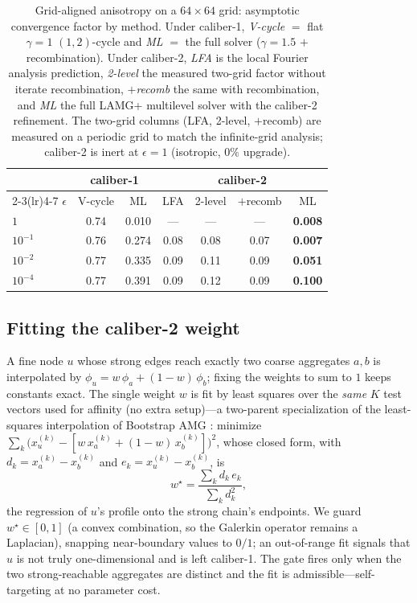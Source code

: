 \documentclass[leqno,letterpaper]{etna}
\begin{document}
\begin{table}[h]\centering\footnotesize\setlength{\tabcolsep}{4pt}
\caption{Grid-aligned anisotropy on a $64\times64$ grid: asymptotic convergence factor by method.
Under caliber-1, \emph{V-cycle} $=$ flat $\gamma{=}1$ $(1,2)$-cycle and \emph{ML} $=$ the full solver
($\gamma{=}1.5$ $+$ recombination). Under caliber-2, \emph{LFA} is the local Fourier analysis
prediction, \emph{2-level} the measured two-grid factor without iterate recombination, \emph{$+$recomb}
the same with recombination, and \emph{ML} the full LAMG+ multilevel solver with the caliber-2
refinement. The two-grid columns (LFA, 2-level, $+$recomb) are measured on a periodic grid to match the
infinite-grid analysis; caliber-2 is inert at $\epsilon{=}1$ (isotropic, $0\%$ upgrade).}\label{tab:aniso}
\begin{tabular}{l cc cccc}
\toprule
 & \multicolumn{2}{c}{caliber-1} & \multicolumn{4}{c}{caliber-2}\\
\cmidrule(lr){2-3}\cmidrule(lr){4-7}
$\epsilon$ & V-cycle & ML & LFA & 2-level & $+$recomb & ML\\
\midrule
$1$       & 0.74 & 0.010 & ---  & ---  & ---  & \textbf{0.008}\\
$10^{-1}$ & 0.76 & 0.274 & 0.08 & 0.08 & 0.07 & \textbf{0.007}\\
$10^{-2}$ & 0.77 & 0.335 & 0.09 & 0.11 & 0.09 & \textbf{0.051}\\
$10^{-4}$ & 0.77 & 0.391 & 0.09 & 0.12 & 0.09 & \textbf{0.100}\\
\bottomrule
\end{tabular}
\end{table}

\subsection{Fitting the caliber-2 weight}
A fine node $u$ whose strong edges reach exactly two
coarse aggregates $a,b$ is interpolated by $\phi_u=w\,\phi_a+(1-w)\,\phi_b$; fixing the weights
to sum to $1$ keeps constants exact. The single weight $w$ is fit by least squares over the
\emph{same} $K$ test vectors used for affinity (no extra setup)---a two-parent specialization of the
least-squares interpolation of Bootstrap AMG \cite{brandt-bootstrap}: minimize
$\sum_k \big(x^{(k)}_u-[w\,x^{(k)}_a+(1-w)\,x^{(k)}_b]\big)^2$, whose closed form, with
$d_k=x^{(k)}_a-x^{(k)}_b$ and $e_k=x^{(k)}_u-x^{(k)}_b$, is
\begin{equation}\label{eq:wfit}
w^\star=\frac{\sum_k d_k\,e_k}{\sum_k d_k^2},
\end{equation}
the regression of $u$'s profile onto the strong chain's endpoints. We guard $w^\star\in[0,1]$
(a convex combination, so the Galerkin operator remains a Laplacian), snapping
near-boundary values to $0/1$; an out-of-range fit signals that $u$ is not truly one-dimensional
and is left caliber-1. The gate fires only when the two strong-reachable aggregates are distinct
and the fit is admissible---self-targeting at no parameter cost.
\end{document}
